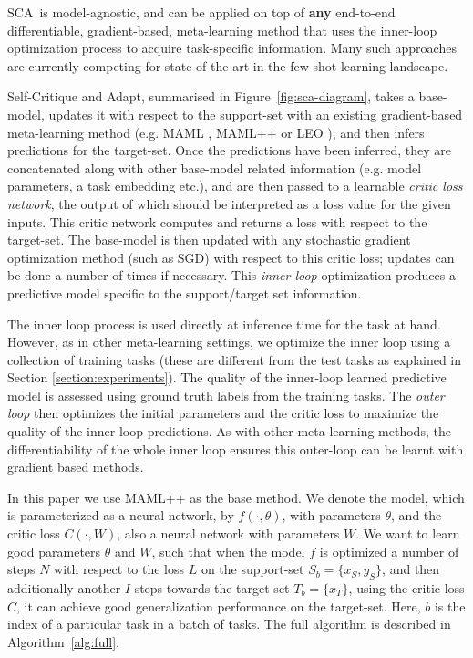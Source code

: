 \documentclass{article} \usepackage[dvipsnames]{xcolor}
\newcommand{\proposedmethod}{SCA}
\begin{document}
\proposedmethod\ is model-agnostic, and can be applied on top of \textbf{any} end-to-end differentiable, gradient-based, meta-learning method that uses the inner-loop optimization process to acquire task-specific information. Many such approaches \citep{ravi2016optimization, finn2017model, li2017meta, antoniou2018train, finn2018probabilistic, qiao2018few, rusu2018meta, grant2018recasting} are currently competing for state-of-the-art in the few-shot learning landscape.

Self-Critique and Adapt, summarised in Figure~\ref{fig:sca-diagram}, takes a base-model, updates it with respect to the support-set with an existing gradient-based meta-learning method (e.g.  MAML \citep{finn2017model}, MAML++ \citep{antoniou2018train} or LEO \citep{rusu2018meta}), and then infers predictions for the target-set. Once the predictions have been inferred, they are concatenated along with other base-model related information (e.g. model parameters, a task embedding etc.), and are then passed to a learnable \emph{critic loss network}, the output of which should be interpreted as a loss value for the given inputs. This critic network computes and returns a loss with respect to the target-set. The base-model is then updated with any stochastic gradient optimization method (such as SGD) with respect to this critic loss; updates can be done a number of times if necessary. This \emph{inner-loop} optimization produces a predictive model specific to the support/target set information. 

The inner loop process is used directly at inference time for the task at hand. However, as in other meta-learning settings, we optimize the inner loop using a collection of training tasks (these are different from the test tasks as explained in Section \ref{section:experiments}).
The quality of the inner-loop learned predictive model is assessed using ground truth labels from the training tasks. The \emph{outer loop} then optimizes the initial parameters and the critic loss to maximize the quality of the inner loop predictions. As with other meta-learning methods, the differentiability of the whole inner loop ensures this outer-loop can be learnt with gradient based methods.








In this paper we use MAML++ as the base method. We denote the model, which is parameterized as a neural network, by $f(\cdot,\theta)$, with parameters $\theta$, and the critic loss $C(\cdot,W)$, also a neural network with parameters $W$. We want to learn good parameters $\theta$ and $W$, such that when the model $f$ is optimized a number of steps $N$ with respect to the loss $L$ on the support-set $S_b=\{x_S, y_S\}$, and then additionally another $I$ steps towards the target-set $T_b=\{x_T\}$, using the critic loss $C$, it can achieve good generalization performance on the target-set. Here, $b$ is the index of a particular task in a batch of tasks.  The full algorithm is described in Algorithm~\ref{alg:full}.
\end{document}
